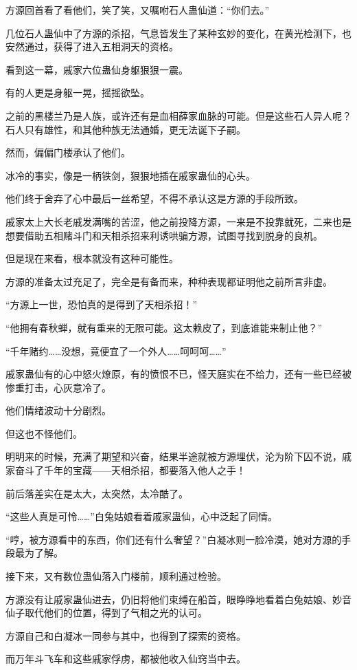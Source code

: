 \begin{this_body}
方源回首看了看他们，笑了笑，又嘱咐石人蛊仙道：“你们去。”

几位石人蛊仙中了方源的杀招，气息皆发生了某种玄妙的变化，在黄光检测下，也安然通过，获得了进入五相洞天的资格。

看到这一幕，戚家六位蛊仙身躯狠狠一震。

有的人更是身躯一晃，摇摇欲坠。

之前的黑楼兰乃是人族，或许还有是血相薛家血脉的可能。但是这些石人异人呢？石人只有雄性，和其他种族无法通婚，更无法诞下子嗣。

然而，偏偏门楼承认了他们。

冰冷的事实，像是一柄铁剑，狠狠地插在戚家蛊仙的心头。

他们终于舍弃了心中最后一丝希望，不得不承认这是方源的手段所致。

戚家太上大长老戚发满嘴的苦涩，他之前投降方源，一来是不投靠就死，二来也是想要借助五相赌斗门和天相杀招来利诱哄骗方源，试图寻找到脱身的良机。

但是现在来看，根本就没有这种可能性。

方源的准备太过充足了，完全是有备而来，种种表现都证明他之前所言非虚。

“方源上一世，恐怕真的是得到了天相杀招！”

“他拥有春秋蝉，就有重来的无限可能。这太赖皮了，到底谁能来制止他？”

“千年赌约……没想，竟便宜了一个外人……呵呵呵……”

戚家蛊仙有的心中怒火燎原，有的愤恨不已，怪天庭实在不给力，还有一些已经被惨重打击，心灰意冷了。

他们情绪波动十分剧烈。

但这也不怪他们。

明明来的时候，充满了期望和兴奋，结果半途就被方源埋伏，沦为阶下囚不说，戚家奋斗了千年的宝藏——天相杀招，都要落入他人之手！

前后落差实在是太大，太突然，太冷酷了。

“这些人真是可怜……”白兔姑娘看着戚家蛊仙，心中泛起了同情。

“哼，被方源看中的东西，你们还有什么奢望？”白凝冰则一脸冷漠，她对方源的手段最为了解。

接下来，又有数位蛊仙落入门楼前，顺利通过检验。

方源没有让戚家蛊仙进去，仍旧将他们束缚在船首，眼睁睁地看着白兔姑娘、妙音仙子取代他们的位置，得到了气相之光的认可。

方源自己和白凝冰一同参与其中，也得到了探索的资格。

而万年斗飞车和这些戚家俘虏，都被他收入仙窍当中去。

\end{this_body}

